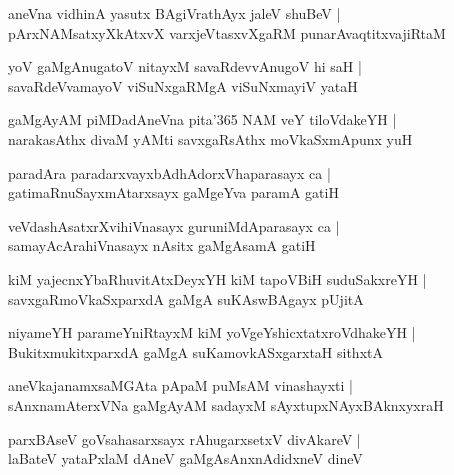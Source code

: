 \documentclass[twoside,12pt,openright]{book}
\newcounter{shloka}[chapter]
\begin{document}
\begin{shloka}%
aneVna vidhinA yasutx BAgiVrathAyx jaleV shuBeV |\\
pArxNAMsatxyXkAtxvX varxjeVtasxvXgaRM punarAvaqtitxvajiRtaM 
\end{shloka}

\begin{shloka}%
yoV gaMgAnugatoV nitayxM savaRdevvAnugoV hi saH |\\
savaRdeVvamayoV viSuNxgaRMgA viSuNxmayiV yataH 
\end{shloka}

\begin{shloka}%
gaMgAyAM piMDadAneVna pita\char'365 NAM veY tiloVdakeYH |\\
narakasAthx divaM yAMti savxgaRsAthx moVkaSxmApunx yuH 
\end{shloka}

\begin{shloka}%
paradAra paradarxvayxbAdhAdorxVhaparasayx ca |\\
gatimaRnuSayxmAtarxsayx gaMgeYva paramA gatiH 
\end{shloka}

\begin{shloka}%
veVdashAsatxrXvihiVnasayx guruniMdAparasayx ca |\\
samayAcArahiVnasayx nAsitx gaMgAsamA gatiH 	
\end{shloka}

\begin{shloka}%
kiM yajecnxYbaRhuvitAtxDeyxYH kiM tapoVBiH suduSakxreYH |\\
savxgaRmoVkaSxparxdA gaMgA suKAswBAgayx pUjitA 
\end{shloka}

\begin{shloka}%
niyameYH parameYniRtayxM kiM yoVgeYshicxtatxroVdhakeYH |\\
BukitxmukitxparxdA gaMgA suKamovkASxgarxtaH sithxtA 
\end{shloka}

\begin{shloka}%
aneVkajanamxsaMGAta pApaM puMsAM vinashayxti |\\
sAnxnamAterxVNa gaMgAyAM sadayxM sAyxtupxNAyxBAknxyxraH 
\end{shloka}

\begin{shloka}%
parxBAseV goVsahasarxsayx rAhugarxsetxV divAkareV |\\
laBateV yataPxlaM dAneV gaMgAsAnxnAdidxneV dineV 
\end{shloka}
\end{document}
